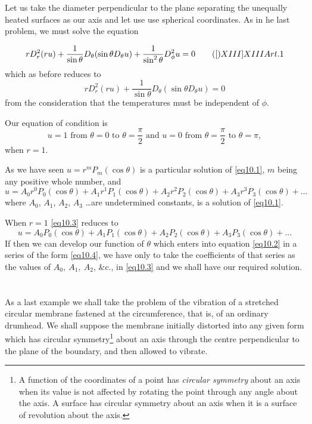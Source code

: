 \documentclass[oneside,12pt]{book}
\begin{document}
Let us take the diameter perpendicular to the plane separating the unequally heated surfaces as our axis and let use use spherical coordinates. As in he last problem, we must solve the equation 

\begin{equation*}
    rD_r^2(ru)+\frac{1}{\sin\theta}D_\theta(\sin\theta D_\theta u)+\frac{1}{\sin^2\theta}D_\phi^2u=0
    \tag[XIII]{XIII Art. 1}
\end{equation*}
which as before reduces to 
\setcounter{equation}{0}
\begin{equation}
    rD_r^2(ru)+\frac{1}{\sin\theta}D_\theta(\sin\theta D_\theta u)=0
    \label{eq10.1}
\end{equation}
from the consideration that the temperatures must be independent of $\phi$. \par 

Our equation of condition is 
\begin{equation}
    u=1\text{ from }\theta=0\text{ to }\theta=\frac{\pi}{2}\text{ and }u=0\text{ from }\theta=\frac{\pi}{2}\text{ to }\theta=\pi,
    \label{eq10.2}
\end{equation}
when $r=1$. \par 

As we have seen $u=r^mP_m(\cos\theta)$ is a particular solution of \eqref{eq10.1}, $m$ being any positive whole number, and 
\begin{equation}
    u=A_0r^0P_0(\cos\theta)+A_1r^1P_1(\cos\theta)+A_2r^2P_2(\cos\theta)+A_3r^3P_3(\cos\theta)+\dots 
    \label{eq10.3}
\end{equation}
where $A_0$, $A_1$, $A_2$, $A_3$ \dots are undetermined constants, is a solution of \eqref{eq10.1}. \par 

When $r=1$ \eqref{eq10.3} reduces to 
\begin{equation}
    u=A_0P_0(\cos\theta)+A_1P_1(\cos\theta)+A_2P_2(\cos\theta)+A_3P_3(\cos\theta)+\dots 
    \label{eq10.4}
\end{equation}
If then we can develop our function of $\theta$ which enters into equation \eqref{eq10.2} in a series of the form \eqref{eq10.4}, we have only to take the coefficients of that series as the values of $A_0,\: A_1,\: A_2$, \&c., in \eqref{eq10.3} and we shall have our required solution. \par 

\setcounter{equation}{0}
\section{} As a last example we shall take the problem of the vibration of a stretched circular membrane fastened at the circumference, that is, of an ordinary drumhead. We shall suppose the membrane initially distorted into any given form which has circular symmetry\footnote{A function of the coordinates of a point has \textit{circular symmetry} about an axis when its value is not affected by rotating the point through any angle about the axis. A surface has circular symmetry about an axis when it is a surface of revolution about the axis.} about an axis through the centre perpendicular to the plane of the boundary, and then allowed to vibrate. \par 
\end{document}
